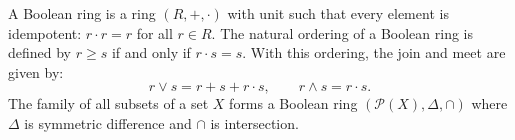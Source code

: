 A Boolean ring is a ring $(R, +, \cdot)$ with unit such that every element is idempotent: $r \cdot r = r$ for all $r \in R$. The natural ordering of a Boolean ring is defined by $r \geq s$ if and only if $r \cdot s = s$. With this ordering, the join and meet are given by:
$$r \vee s = r + s + r \cdot s, \qquad r \wedge s = r \cdot s.$$
The family of all subsets of a set $X$ forms a Boolean ring $(\mathcal{P}(X), \Delta, \cap)$ where $\Delta$ is symmetric difference and $\cap$ is intersection.
